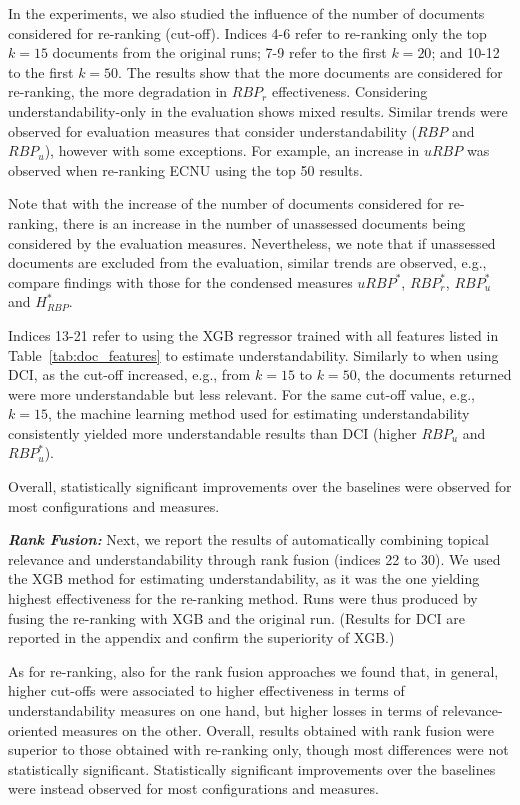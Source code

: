 \documentclass[10pt,a4paper]{article}
\begin{document}
In the experiments, we also studied the influence of the number of documents considered for re-ranking (cut-off). Indices 4-6 refer to re-ranking only the top $k=15$ documents from the original runs; 7-9 refer to the first $k=20$; and 10-12 to the first $k=50$. The results show that the more documents are considered for re-ranking, the more degradation in $RBP_r$ effectiveness. Considering understandability-only in the evaluation shows mixed results. Similar trends were observed for evaluation measures that consider understandability ($RBP$ and $RBP_u$), however with some exceptions. For example, an increase in $uRBP$ was observed when re-ranking ECNU using the top 50 results. 

Note that with the increase of the number of documents considered for re-ranking, there is an increase in the number of unassessed documents being considered by the evaluation measures. 
Nevertheless, we note that if unassessed documents are excluded from the evaluation, similar trends are observed, e.g., compare findings with those for the condensed measures $uRBP^*$, $RBP_r^*$, $RBP_u^*$ and $H_{RBP}^*$.

Indices 13-21 refer to using the XGB regressor trained with all features listed in Table~\ref{tab:doc_features} to estimate understandability. Similarly to when using DCI, as the cut-off increased, e.g., from $k=15$ to $k=50$, the documents returned were more understandable but less relevant. For the same cut-off value, e.g., $k=15$, the machine learning method used for estimating understandability consistently yielded more understandable results than DCI (higher $RBP_u$ and $RBP_u^*$). 

Overall, statistically significant improvements over the baselines were observed for most configurations and measures.  

\textit{\textbf{Rank Fusion:}} Next, we report the results of automatically combining topical relevance and understandability through rank fusion (indices 22 to 30). We used the XGB method for estimating understandability, as it was the one yielding highest effectiveness for the re-ranking method. Runs were thus produced by fusing the re-ranking with XGB and the original run. (Results for DCI are reported in the appendix and confirm the superiority of XGB.) 

As for re-ranking, also for the rank fusion approaches we found that, in general, higher cut-offs were associated to higher effectiveness in terms of understandability measures on one hand, but higher losses in terms of relevance-oriented measures on the other. Overall, results obtained with rank fusion were superior to those obtained with re-ranking only, though most differences were not statistically significant. Statistically significant improvements over the baselines were instead observed for most configurations and measures.  
\end{document}
